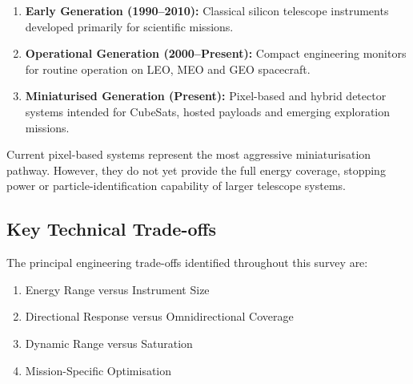 \begin{enumerate}[noitemsep]
\item \textbf{Early Generation (1990--2010):} Classical silicon telescope instruments developed primarily for scientific missions.
\item \textbf{Operational Generation (2000--Present):} Compact engineering monitors for routine operation on LEO, MEO and GEO spacecraft.
\item \textbf{Miniaturised Generation (Present):} Pixel-based and hybrid detector systems intended for CubeSats, hosted payloads and emerging exploration missions.
\end{enumerate}

Current pixel-based systems represent the most aggressive miniaturisation pathway. However, they do not yet provide the full energy coverage, stopping power or particle-identification capability of larger telescope systems.


\subsection{Key Technical Trade-offs}

The principal engineering trade-offs identified throughout this survey are:

\begin{enumerate}[noitemsep]
\item Energy Range versus Instrument Size
\item Directional Response versus Omnidirectional Coverage
\item Dynamic Range versus Saturation
\item Mission-Specific Optimisation
\end{enumerate}
